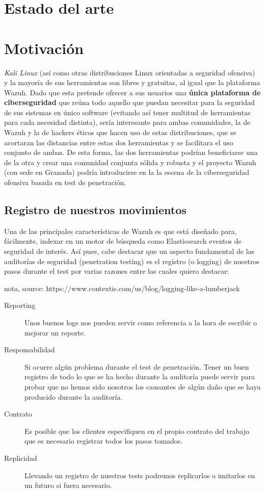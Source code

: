 \section{Estado del arte}

\section{Motivación}

\textit{Kali Linux} (así como otras distribuciones Linux orientadas a seguridad ofensiva) y la mayoría de sus herramientas son libres y gratuitas, al igual que la plataforma Wazuh. Dado que esta pretende ofrecer a sus usuarios una \textbf{única plataforma de ciberseguridad } que reúna todo aquello que puedan necesitar para la seguridad de sus sistemas en único software (evitando así tener multitud de herramientas para cada necesidad distinta), sería interesante para ambas comunidades, la de Wazuh y la de hackers éticos que hacen uso de estas distribuciones, que se acortaran las distancias entre estas dos herramientas y se facilitara el uso conjunto de ambas. De esta forma, las dos herramientas podrían beneficiarse una de la otra y crear una comunidad conjunta sólida y robusta y el proyecto Wazuh (con sede en Granada) podría introducirse en la la escena de la ciberseguridad ofensiva basada en test de penetración.

\subsection{Registro de nuestros movimientos}
Una de las principales características de Wazuh es que está diseñado para, fácilmente, indexar en un motor de búsqueda como Elasticsearch eventos de seguridad de interés. Así pues, cabe destacar que un aspecto fundamental de las auditorías de seguridad (penetration testing) es el registro (o logging) de nuestros pasos durante el test por varias razones entre las cuales quiero destacar:

nota, source: https://www.contextis.com/us/blog/logging-like-a-lumberjack

\begin{description}
\item[Reporting] Unos buenos logs nos pueden servir como referencia a la hora de escribir o mejorar un reporte.
\item[Responsabilidad] Si ocurre algún problema durante el test de penetración. Tener un buen registro de todo lo que se ha hecho durante la auditoría puede servir para probar que no hemos sido nosotros los causantes de algún daño que se haya producido durante la auditoría.
\item[Contrato] Es posible que los clientes especifiquen en el propio contrato del trabajo que es necesario registrar todos los pasos tomados.
\item[Replicidad] Llevando un registro de nuestros tests podremos replicarlos o imitarlos en un futuro si fuera necesario. 
\end{description}

